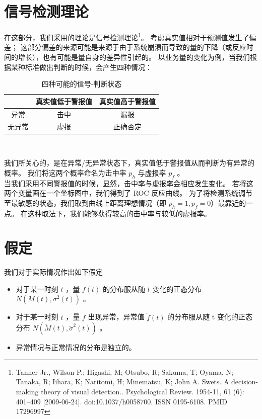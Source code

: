 \documentclass[a4paper]{article}
\begin{document}
\section{信号检测理论}
在这部分，我们采用的理论是信号检测理论\footnote{Tanner Jr., Wilson P.; Higashi, M; Otsubo, R; Sakuma, T; Oyama, N; Tanaka, R; Iihara, K; Naritomi, H; Minematsu, K; John A. Swets. A decision-making theory of visual detection.. Psychological Review. 1954-11, 61 (6): 401–409 [2009-06-24]. doi:10.1037/h0058700. ISSN 0195-6108. PMID 17296997}。
考虑真实值相对于预测值发生了偏差；
这部分偏差的来源可能是来源于由于系统崩溃而导致的量的下降（或反应时间的增长），也有可能是量自身的差异性引起的。
以业务量的变化为例，当我们根据某种标准做出判断的时候，会产生四种情况：
\begin{table}[H]
	\centering
	\caption{四种可能的信号-判断状态}
	\label{tab:sdt-four}
	\begin{tabular}{|c|c|c|}
		\hline
		 & 真实值低于警报值 & 真实值高于警报值 \\
		\hline
		异常 & 击中 & 漏报 \\
		\hline
		无异常 & 虚报 & 正确否定 \\
		\hline
	\end{tabular} \\
\end{table}
我们所关心的，是在异常/无异常状态下，真实值低于警报值从而判断为有异常的概率。
我们将这两个概率命名为击中率 $p_h$ 与虚报率 $p_f$ 。
\\
\indent 当我们采用不同警报值的时候，显然，击中率与虚报率会相应发生变化。
若将这两个变量画在一个坐标图中，我们得到了 ROC 反应曲线。
为了将检测系统调节至最敏感的状态，我们取到曲线上距离理想情况（即 $p_h = 1, p_f = 0$）最靠近的一点。
在这种取法下，我们能够获得较高的击中率与较低的虚报率。
\section{假定}
我们对于实际情况作出如下假定
\begin{itemize}
    \item 对于某一时刻 $t$ ，量 $f(t)$ 的分布服从随 $t$ 变化的正态分布 $N(M(t), \sigma^2(t))$ 。
    \item 对于某一时刻 $t$ ，量 $f$ 出现异常，异常值 $\tilde{f}(t)$ 的分布服从随 t 变化的正态分布 $N(\tilde{M}(t), \tilde{\sigma}^2(t))$ 。
    \item 异常情况与正常情况的分布是独立的。
\end{itemize}
\end{document}
